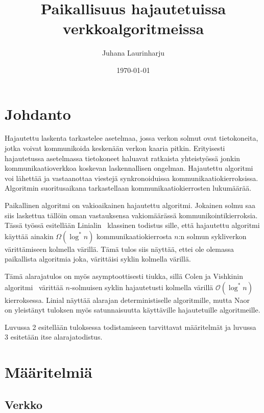 \documentclass[finnish]{tktltiki2}
\title{Paikallisuus hajautetuissa verkkoalgoritmeissa}
\author{Juhana Laurinharju}
\date{\today}
\theoremstyle{definition}
\theoremstyle{remark}
\begin{document}

\maketitle        %
\makeabstract     %

\tableofcontents  %
\newpage          %



\section{Johdanto}

Hajautettu laskenta tarkastelee asetelmaa, jossa verkon solmut ovat
tietokoneita, jotka voivat kommunikoida keskenään verkon kaaria pitkin.
Erityisesti hajautetussa asetelmassa tietokoneet haluavat ratkaista
yhteistyössä jonkin kommunikaatioverkkoa koskevan laskennallisen ongelman.
Hajautettu algoritmi voi lähettää ja vastaanottaa viestejä synkronoiduissa
kommunikaatiokierroksissa. Algoritmin suoritusaikana tarkastellaan
kommunikaatiokierrosten lukumäärää.

Paikallinen algoritmi on vakioaikainen hajautettu algoritmi. Jokainen solmu saa
siis laskettua tällöin oman vastauksensa vakiomäärässä kommunikointikierroksia.
Tässä työssä esitellään Linialin~\cite{linial92} klassinen todistus sille, että
hajautettu algoritmi käyttää ainakin $\Omega(\log^* n)$ kommunikaatiokierrosta
$n$:n solmun sykliverkon värittämiseen kolmella värillä. Tämä tulos siis
näyttää, ettei ole olemassa paikallista algoritmia joka, värittäisi syklin
kolmella värillä.

Tämä alarajatulos on myös asymptoottisesti tiukka, sillä Colen ja Vishkinin
algoritmi~\cite{colevishkin86} värittää $n$-solmuisen syklin hajautetusti
kolmella värillä $\mathcal{O}(\log^* n)$ kierroksessa. Linial näyttää alarajan
deterministiselle algoritmille, mutta Naor~\cite{naor91} on yleistänyt tuloksen
myös satunnaisuutta käyttäville hajautetuille algoritmeille.

Luvussa 2 esitellään tuloksessa todistamiseen tarvittavat määritelmät ja
luvussa 3 esitetään itse alarajatodistus.

\section{Määritelmiä}

\subsection{Verkko}
\end{document}
